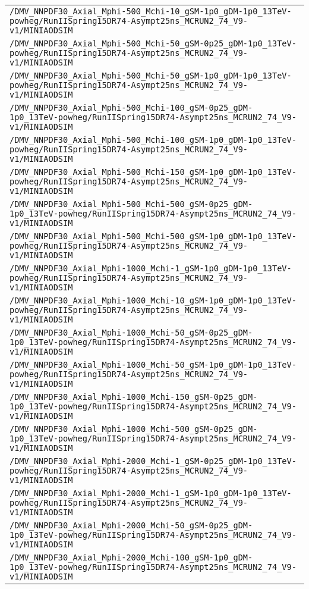 \begin{center}
\begin{tabular}{l}
\verb!/DMV_NNPDF30_Axial_Mphi-500_Mchi-10_gSM-1p0_gDM-1p0_13TeV-powheg/RunIISpring15DR74-Asympt25ns_MCRUN2_74_V9-v1/MINIAODSIM! \tabularnewline
\verb!/DMV_NNPDF30_Axial_Mphi-500_Mchi-50_gSM-0p25_gDM-1p0_13TeV-powheg/RunIISpring15DR74-Asympt25ns_MCRUN2_74_V9-v1/MINIAODSIM! \tabularnewline
\verb!/DMV_NNPDF30_Axial_Mphi-500_Mchi-50_gSM-1p0_gDM-1p0_13TeV-powheg/RunIISpring15DR74-Asympt25ns_MCRUN2_74_V9-v1/MINIAODSIM! \tabularnewline
\verb!/DMV_NNPDF30_Axial_Mphi-500_Mchi-100_gSM-0p25_gDM-1p0_13TeV-powheg/RunIISpring15DR74-Asympt25ns_MCRUN2_74_V9-v1/MINIAODSIM! \tabularnewline
\verb!/DMV_NNPDF30_Axial_Mphi-500_Mchi-100_gSM-1p0_gDM-1p0_13TeV-powheg/RunIISpring15DR74-Asympt25ns_MCRUN2_74_V9-v1/MINIAODSIM! \tabularnewline
\verb!/DMV_NNPDF30_Axial_Mphi-500_Mchi-150_gSM-1p0_gDM-1p0_13TeV-powheg/RunIISpring15DR74-Asympt25ns_MCRUN2_74_V9-v1/MINIAODSIM! \tabularnewline
\verb!/DMV_NNPDF30_Axial_Mphi-500_Mchi-500_gSM-0p25_gDM-1p0_13TeV-powheg/RunIISpring15DR74-Asympt25ns_MCRUN2_74_V9-v1/MINIAODSIM! \tabularnewline
\verb!/DMV_NNPDF30_Axial_Mphi-500_Mchi-500_gSM-1p0_gDM-1p0_13TeV-powheg/RunIISpring15DR74-Asympt25ns_MCRUN2_74_V9-v1/MINIAODSIM! \tabularnewline
\verb!/DMV_NNPDF30_Axial_Mphi-1000_Mchi-1_gSM-1p0_gDM-1p0_13TeV-powheg/RunIISpring15DR74-Asympt25ns_MCRUN2_74_V9-v1/MINIAODSIM! \tabularnewline
\verb!/DMV_NNPDF30_Axial_Mphi-1000_Mchi-10_gSM-1p0_gDM-1p0_13TeV-powheg/RunIISpring15DR74-Asympt25ns_MCRUN2_74_V9-v1/MINIAODSIM! \tabularnewline
\verb!/DMV_NNPDF30_Axial_Mphi-1000_Mchi-50_gSM-0p25_gDM-1p0_13TeV-powheg/RunIISpring15DR74-Asympt25ns_MCRUN2_74_V9-v1/MINIAODSIM! \tabularnewline
\verb!/DMV_NNPDF30_Axial_Mphi-1000_Mchi-50_gSM-1p0_gDM-1p0_13TeV-powheg/RunIISpring15DR74-Asympt25ns_MCRUN2_74_V9-v1/MINIAODSIM! \tabularnewline
\verb!/DMV_NNPDF30_Axial_Mphi-1000_Mchi-150_gSM-0p25_gDM-1p0_13TeV-powheg/RunIISpring15DR74-Asympt25ns_MCRUN2_74_V9-v1/MINIAODSIM! \tabularnewline
\verb!/DMV_NNPDF30_Axial_Mphi-1000_Mchi-500_gSM-0p25_gDM-1p0_13TeV-powheg/RunIISpring15DR74-Asympt25ns_MCRUN2_74_V9-v1/MINIAODSIM! \tabularnewline
\verb!/DMV_NNPDF30_Axial_Mphi-2000_Mchi-1_gSM-0p25_gDM-1p0_13TeV-powheg/RunIISpring15DR74-Asympt25ns_MCRUN2_74_V9-v1/MINIAODSIM! \tabularnewline
\verb!/DMV_NNPDF30_Axial_Mphi-2000_Mchi-1_gSM-1p0_gDM-1p0_13TeV-powheg/RunIISpring15DR74-Asympt25ns_MCRUN2_74_V9-v1/MINIAODSIM! \tabularnewline
\verb!/DMV_NNPDF30_Axial_Mphi-2000_Mchi-50_gSM-0p25_gDM-1p0_13TeV-powheg/RunIISpring15DR74-Asympt25ns_MCRUN2_74_V9-v1/MINIAODSIM! \tabularnewline
\verb!/DMV_NNPDF30_Axial_Mphi-2000_Mchi-100_gSM-1p0_gDM-1p0_13TeV-powheg/RunIISpring15DR74-Asympt25ns_MCRUN2_74_V9-v1/MINIAODSIM! \tabularnewline

\end{tabular}
\end{center}
